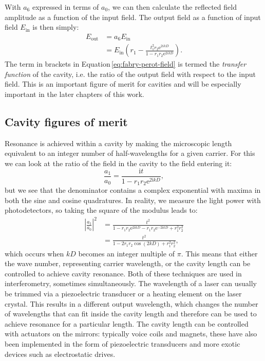 With $a_6$ expressed in terms of $a_0$, we can then calculate the reflected field amplitude as a function of the input field. The output field as a function of input field $E_{\text{in}}$ is then simply:
\begin{equation}
  \label{eq:fabry-perot-field}
  \begin{split}
    E_{\text{out}} &= a_6 E_{\text{in}} \\
                   &= E_{\text{in}} \left( r_1 - \frac{t_1^2 r_2 \text{e}^{2ikD}}{1 - r_1 r_2 \text{e}^{2ikD}} \right).
  \end{split}
\end{equation}
The term in brackets in Equation\,\ref{eq:fabry-perot-field} is termed the \emph{transfer function} of the cavity, i.e. the ratio of the output field with respect to the input field. This is an important figure of merit for cavities and will be especially important in the later chapters of this work.

\subsection{\label{sec:cavity-fom}Cavity figures of merit}
Resonance is achieved within a \FP{} cavity by making the microscopic length equivalent to an integer number of half-wavelengths for a given carrier. For this we can look at the ratio of the field in the cavity to the field entering it:
\begin{equation}
  \frac{a_1}{a_0} = \frac{\text{i} t}{1 - r_1 r_2 \text{e}^{2\text{i}kD}},
\end{equation}
but we see that the denominator contains a complex exponential with maxima in both the sine and cosine quadratures. In reality, we measure the light power with photodetectors, so taking the square of the modulus leads to:
\begin{equation}
  \begin{split}
    \left|\frac{a_1}{a_0}\right|^2 &= \frac{t^2}{1-r_1 r_2 \text{e}^{2\text{i}kD} - r_1 r_2 \text{e}^{-2\text{i}kD} + r_1^2 r_2^2} \\
                                   &= \frac{t^2}{1 - 2 r_1 r_2 \cos{\left( 2kD \right)} + r_1^2 r_2^2},
  \end{split}
\end{equation}
which occurs when $kD$ becomes an integer multiple of $\pi$. This means that either the wave number, representing carrier wavelength, or the cavity length can be controlled to achieve cavity resonance. Both of these techniques are used in interferometry, sometimes simultaneously. The wavelength of a laser can usually be trimmed via a piezoelectric transducer or a heating element on the laser crystal. This results in a different output wavelength, which changes the number of wavelengths that can fit inside the cavity length and therefore can be used to achieve resonance for a particular length. The cavity length can be controlled with actuators on the mirrors: typically voice coils and magnets, these have also been implemented in the form of piezoelectric transducers and more exotic devices such as electrostatic drives.

